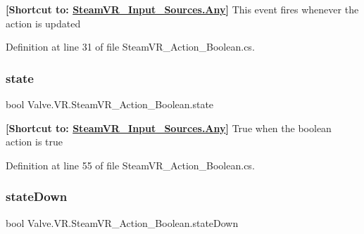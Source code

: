 {\bfseries{\mbox{[}Shortcut to\+: \mbox{\hyperlink{namespace_valve_1_1_v_r_a82e5bf501cc3aa155444ee3f0662853faed36a1ef76a59ee3f15180e0441188ad}{Steam\+V\+R\+\_\+\+Input\+\_\+\+Sources.\+Any}}\mbox{]}}} This event fires whenever the action is updated 



Definition at line 31 of file Steam\+V\+R\+\_\+\+Action\+\_\+\+Boolean.\+cs.

\mbox{\label{class_valve_1_1_v_r_1_1_steam_v_r___action___boolean_a9378404032027ec121903aef42227c6a}} 
\subsubsection{\texorpdfstring{state}{state}}
{\footnotesize\ttfamily bool Valve.\+V\+R.\+Steam\+V\+R\+\_\+\+Action\+\_\+\+Boolean.\+state\hspace{0.3cm}{\ttfamily [get]}}



{\bfseries{\mbox{[}Shortcut to\+: \mbox{\hyperlink{namespace_valve_1_1_v_r_a82e5bf501cc3aa155444ee3f0662853faed36a1ef76a59ee3f15180e0441188ad}{Steam\+V\+R\+\_\+\+Input\+\_\+\+Sources.\+Any}}\mbox{]}}} True when the boolean action is true 



Definition at line 55 of file Steam\+V\+R\+\_\+\+Action\+\_\+\+Boolean.\+cs.

\mbox{\label{class_valve_1_1_v_r_1_1_steam_v_r___action___boolean_ac7b9134271850b1ff2225d93763d7b55}} 
\subsubsection{\texorpdfstring{stateDown}{stateDown}}
{\footnotesize\ttfamily bool Valve.\+V\+R.\+Steam\+V\+R\+\_\+\+Action\+\_\+\+Boolean.\+state\+Down\hspace{0.3cm}{\ttfamily [get]}}



